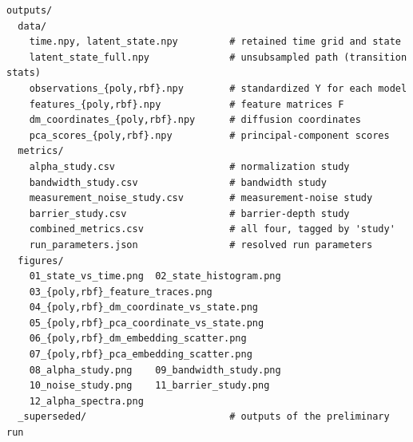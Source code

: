 \documentclass[11pt]{article}
\begin{document}
\begin{small}
\begin{verbatim}
outputs/
  data/
    time.npy, latent_state.npy         # retained time grid and state
    latent_state_full.npy              # unsubsampled path (transition stats)
    observations_{poly,rbf}.npy        # standardized Y for each model
    features_{poly,rbf}.npy            # feature matrices F
    dm_coordinates_{poly,rbf}.npy      # diffusion coordinates
    pca_scores_{poly,rbf}.npy          # principal-component scores
  metrics/
    alpha_study.csv                    # normalization study
    bandwidth_study.csv                # bandwidth study
    measurement_noise_study.csv        # measurement-noise study
    barrier_study.csv                  # barrier-depth study
    combined_metrics.csv               # all four, tagged by 'study'
    run_parameters.json                # resolved run parameters
  figures/
    01_state_vs_time.png  02_state_histogram.png
    03_{poly,rbf}_feature_traces.png
    04_{poly,rbf}_dm_coordinate_vs_state.png
    05_{poly,rbf}_pca_coordinate_vs_state.png
    06_{poly,rbf}_dm_embedding_scatter.png
    07_{poly,rbf}_pca_embedding_scatter.png
    08_alpha_study.png    09_bandwidth_study.png
    10_noise_study.png    11_barrier_study.png
    12_alpha_spectra.png
  _superseded/                         # outputs of the preliminary run
\end{verbatim}
\end{small}
\end{document}
